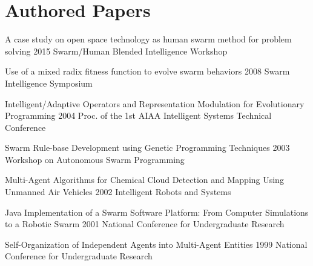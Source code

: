 \documentclass{cv_style}
\begin{document}

	\section{Authored Papers}
		\begin{etaremune}			
			\item \paper
				{A case study on open space technology as human swarm method for problem solving}
				{2015 Swarm/Human Blended Intelligence Workshop}

			\item \paper
				{Use of a mixed radix fitness function to evolve swarm behaviors}
				{2008 Swarm Intelligence Symposium}

			\item \paper
				{Intelligent/Adaptive Operators and Representation Modulation for Evolutionary Programming}
				{2004 Proc. of the 1st AIAA Intelligent Systems Technical Conference}
			
			\item \paper
				{Swarm Rule-base Development using Genetic Programming Techniques}
				{2003 Workshop on Autonomous Swarm Programming}

			\item \paper
				{Multi-Agent Algorithms for Chemical Cloud Detection and Mapping Using Unmanned Air Vehicles}
				{2002 Intelligent Robots and Systems}

			\item \paper
				{Java Implementation of a Swarm Software Platform: From Computer Simulations to a Robotic Swarm}
				{2001 National Conference for Undergraduate Research}

			\item \paper
				{Self-Organization of Independent Agents into Multi-Agent Entities}
				{1999 National Conference for Undergraduate Research}
		\end{etaremune}
\end{document}
